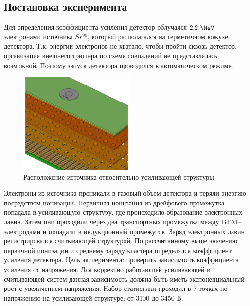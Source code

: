 \subsection{Постановка эксперимента}
Для определения коэффициента усиления детектор облучался $2.2~\MeV$ электронами источника $Sr^{90}$, который располагался на герметичном кожухе детектора. Т.к. энергии электронов не хватало, чтобы пройти сквозь детектор, организация внешнего триггера по схеме совпадений не представлялась возможной. Поэтому запуск детектора проводился в автоматическом режиме.
\begin{figure}[H]
	\centering
	\includegraphics[height = 4 cm, width= 5.8cm]{img/GEM_Sr_source.pdf}
	\caption{Расположение источника относительно усиливающей структуры}
	\label{fig:det_scheme+sr90}
\end{figure}
Электроны из источника проникали в газовый объем детектора и теряли энергию посредством ионизации. 
Первичная ионизация из дрейфового промежутка попадала в усиливающую структуру, где происходило образование электронных лавин. Затем они проходили через два транспортных промежутка между GEM--электродами и попадали в индукционный промежуток. Заряд электронных лавин регистрировался считывающей структурой. По рассчитанному выше значению первичной ионизации и среднему заряду кластера определялся коэффициент усиления детектора. Цель эксперимента: проверить зависимость коэффициента усиления от напряжения. Для корректно работающей усиливающей и считывающей систем данная зависимость должна быть иметь экспоненциальный рост с увеличением напряжения. Набор статистики проходил в 7 точках по напряжению на усиливающей структуре: от 3100 до 3450 В.

